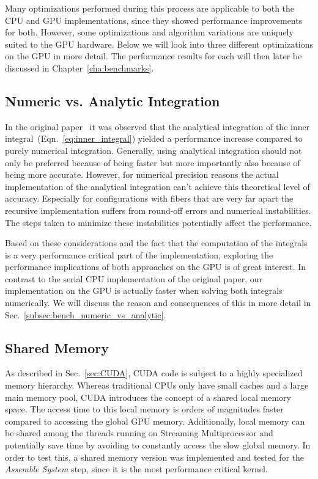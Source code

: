 Many optimizations performed during this process are applicable to both the CPU and GPU implementations, since they showed performance improvements for both. However, some optimizations and algorithm variations are uniquely suited to the GPU hardware. Below we will look into three different optimizations on the GPU in more detail. The performance results for each will then later be discussed in Chapter~\ref{cha:benchmarks}.

\subsection{Numeric vs. Analytic Integration}
\label{subsec:numeric_analytic}
In the original paper~\cite{Tornberg2006} it was observed that the analytical integration of the inner integral~(Eqn.~\eqref{eq:inner_integral}) yielded a performance increase compared to purely numerical integration. Generally, using analytical integration should not only be preferred because of being faster but more importantly also because of being more accurate. However, for numerical precision reasons the actual implementation of the analytical integration can't achieve this theoretical level of accuracy. Especially for configurations with fibers that are very far apart the recursive implementation suffers from round-off errors and numerical instabilities. The steps taken to minimize these instabilities potentially affect the performance.

Based on these considerations and the fact that the computation of the integrals is a very performance critical part of the implementation, exploring the performance implications of both approaches on the GPU is of great interest. In contrast to the serial CPU implementation of the original paper, our implementation on the GPU is actually faster when solving both integrals numerically. We will discuss the reason and consequences of this in more detail in Sec.~\ref{subsec:bench_numeric_vs_analytic}.

\subsection{Shared Memory}
\label{subsec:shared_memory}

As described in Sec.~\ref{sec:CUDA}, CUDA code is subject to a highly specialized memory hierarchy. Whereas traditional CPUs only have small caches and a large main memory pool, CUDA introduces the concept of a shared local memory space. The access time to this local memory is orders of magnitudes faster compared to accessing the global GPU memory. Additionally, local memory can be shared among the threads running on Streaming Multiprocessor and potentially save time by avoiding to constantly access the slow global memory. In order to test this, a shared memory version was implemented and tested for the \emph{Assemble System} step, since it is the most performance critical kernel.

